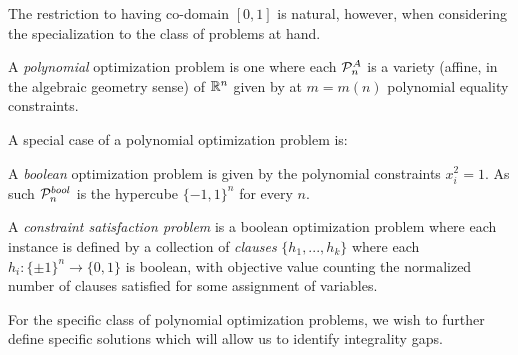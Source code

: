 \documentclass[runningheads,a4paper,english]{llncs}[2022/01/12]
\begin{document}
The restriction to having co-domain $[0,1]$ is natural, however, when considering the specialization to the class of problems at hand.

\begin{definition}
  A \emph{polynomial} optimization problem is one where each $\mathcal{P}_n^A$ is a variety (affine, in the algebraic geometry sense) of $\mathbb{R}^n$ given by at $m = m(n)$ polynomial equality constraints.
\end{definition}
A special case of a polynomial optimization problem is:
\begin{definition}
  A \emph{boolean} optimization problem is given by the polynomial constraints $x_i^2 = 1$. As such $\mathcal{P}_n^{bool}$ is the hypercube $\{-1,1\}^n$ for every $n$.
\end{definition}
\begin{definition}
  A \emph{constraint satisfaction problem} is a boolean optimization problem where each instance is defined by a collection of \emph{clauses} $\{h_1, ..., h_k\}$ where each $h_i : \{\pm 1\}^n \to \{0,1\}$ is boolean, with objective value counting the normalized number of clauses satisfied for some assignment of variables.
\end{definition}

For the specific class of polynomial optimization problems, we wish to further define specific solutions which will allow us to identify integrality gaps.
\end{document}
